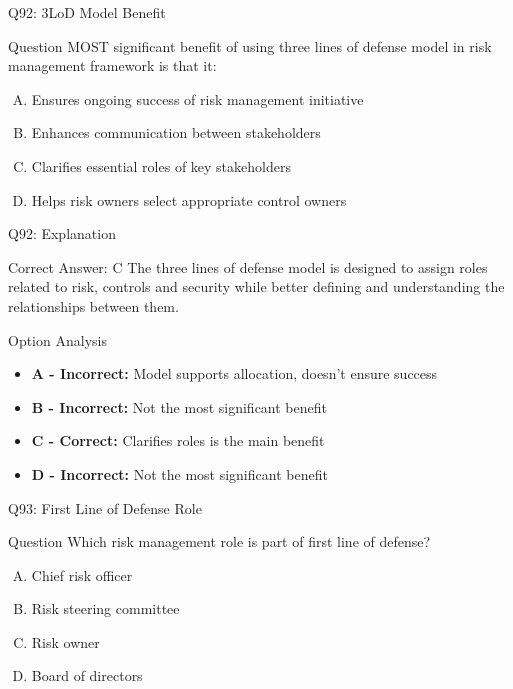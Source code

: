 \documentclass{beamer}
\begin{document}
	\begin{frame}{Q92: 3LoD Model Benefit}
		\begin{block}{Question}
			MOST significant benefit of using three lines of defense model in risk management framework is that it:
		\end{block}
		\begin{enumerate}[(A)]
			\item Ensures ongoing success of risk management initiative
			\item Enhances communication between stakeholders
			\item Clarifies essential roles of key stakeholders
			\item Helps risk owners select appropriate control owners
		\end{enumerate}
	\end{frame}
	
	\begin{frame}{Q92: Explanation}
		\begin{block}{Correct Answer: C}
			The three lines of defense model is designed to assign roles related to risk, controls and security while better defining and understanding the relationships between them.
		\end{block}
		\begin{block}{Option Analysis}
			\begin{itemize}
				\item \textbf{A - Incorrect:} Model supports allocation, doesn't ensure success
				\item \textbf{B - Incorrect:} Not the most significant benefit
				\item \textbf{C - Correct:} Clarifies roles is the main benefit
				\item \textbf{D - Incorrect:} Not the most significant benefit
			\end{itemize}
		\end{block}
	\end{frame}
	
	\begin{frame}{Q93: First Line of Defense Role}
		\begin{block}{Question}
			Which risk management role is part of first line of defense?
		\end{block}
		\begin{enumerate}[(A)]
			\item Chief risk officer
			\item Risk steering committee
			\item Risk owner
			\item Board of directors
		\end{enumerate}
	\end{frame}
	
\end{document}
